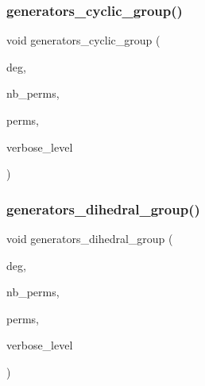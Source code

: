 \subsubsection{\texorpdfstring{generators\+\_\+cyclic\+\_\+group()}{generators\_cyclic\_group()}}
{\footnotesize\ttfamily void generators\+\_\+cyclic\+\_\+group (\begin{DoxyParamCaption}\item[{\mbox{\hyperlink{galois_8h_a09fddde158a3a20bd2dcadb609de11dc}{I\+NT}}}]{deg,  }\item[{\mbox{\hyperlink{galois_8h_a09fddde158a3a20bd2dcadb609de11dc}{I\+NT}} \&}]{nb\+\_\+perms,  }\item[{\mbox{\hyperlink{galois_8h_a09fddde158a3a20bd2dcadb609de11dc}{I\+NT}} $\ast$\&}]{perms,  }\item[{\mbox{\hyperlink{galois_8h_a09fddde158a3a20bd2dcadb609de11dc}{I\+NT}}}]{verbose\+\_\+level }\end{DoxyParamCaption})}

\mbox{\label{group__generators_8_c_a2507a40a2a90fb0635fc0c145b35cf8d}} 
\subsubsection{\texorpdfstring{generators\+\_\+dihedral\+\_\+group()}{generators\_dihedral\_group()}}
{\footnotesize\ttfamily void generators\+\_\+dihedral\+\_\+group (\begin{DoxyParamCaption}\item[{\mbox{\hyperlink{galois_8h_a09fddde158a3a20bd2dcadb609de11dc}{I\+NT}}}]{deg,  }\item[{\mbox{\hyperlink{galois_8h_a09fddde158a3a20bd2dcadb609de11dc}{I\+NT}} \&}]{nb\+\_\+perms,  }\item[{\mbox{\hyperlink{galois_8h_a09fddde158a3a20bd2dcadb609de11dc}{I\+NT}} $\ast$\&}]{perms,  }\item[{\mbox{\hyperlink{galois_8h_a09fddde158a3a20bd2dcadb609de11dc}{I\+NT}}}]{verbose\+\_\+level }\end{DoxyParamCaption})}

\mbox{\label{group__generators_8_c_a8d19e7bec1338c3891c7146bb2e07f96}} 
